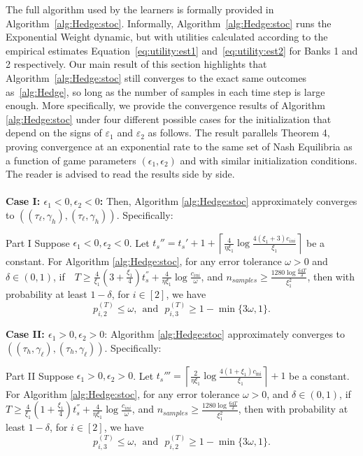 The full algorithm used by the learners is formally provided in Algorithm~\ref{alg:Hedge:stoc}. 
Informally, Algorithm~\ref{alg:Hedge:stoc} runs the Exponential Weight dynamic, but with utilities calculated according to the empirical estimates Equation~\eqref{eq:utility:est1} and~\eqref{eq:utility:est2} for Banks 1 and 2 respectively.
Our main result of this section highlights that Algorithm~\ref{alg:Hedge:stoc} still converges to the exact same outcomes as~\ref{alg:Hedge}, so long as the number of samples in each time step is large enough. More specifically, we provide the convergence results of Algorithm \ref{alg:Hedge:stoc} under four different possible cases for the initialization that depend on the signs of $\varepsilon_1$ and $\varepsilon_2$ as follows.
The result parallels Theorem 4, proving convergence at an exponential rate to the same set of Nash Equilibria as a function of game parameters $(\epsilon_1,\epsilon_2)$ and with similar initialization conditions.
The reader is advised to read the results side by side.
\\
\\\textbf{Case I: $\epsilon_1<0,\epsilon_2<0$:} Then, Algorithm \ref{alg:Hedge:stoc} approximately converges to $((\tau_{\ell},\gamma_{h}),(\tau_{\ell},\gamma_{h}))$. Specifically:

\begin{fixedtheorem}{Part I}\label{thm:stocccc}
Suppose $\epsilon_1<0,\epsilon_2<0$. Let 
$t_s''=t_s'+1+\left\lceil\frac{4}{\eta\xi_1}\log\frac{4(\xi_1+3)c_{ini}}{\xi_1}\right\rceil$ be a constant. For Algorithm \ref{alg:Hedge:stoc}, for any error tolerance $\omega>0$ and $\delta\in(0,1)$, if\ \ $T\geq \frac{4}{\xi_1}\left(3+\frac{\xi_1}{4}\right)t^{''}_s+\frac{4}{\eta\xi_1}\log\frac{c_{ini}}{\omega}$, and $n_{samples}\geq \frac{1280\log\frac{64T}{\delta}}{\xi_1^2}$, then with probability at least $1-\delta$, for $i\in[2]$,  we have 
$$p_{i,2}^{(T)}\leq \omega,\ \  \text{and}\ \ \  p_{i,3}^{(T)}\geq 1-\min\{3\omega,1\}.$$
\end{fixedtheorem}

\noindent \textbf{Case II: $\epsilon_1>0,\epsilon_2>0$}: Algorithm \ref{alg:Hedge:stoc} approximately converges to $((\tau_{h},\gamma_{\ell}),(\tau_{h},\gamma_{\ell}))$. Specifically:

\begin{fixedtheorem}{Part II}
Suppose $\epsilon_1>0,\epsilon_2>0$. Let $t_s'''=\left\lceil\frac{2}{\eta\xi_1}\log\frac{4(1+\xi_1)c_{\text{ini}}}{\xi_1}\right\rceil+1$ be a constant.  For Algorithm \ref{alg:Hedge:stoc}, for any error tolerance $\omega>0$, and $\delta\in(0,1)$, if $T\geq \frac{4}{\xi_1}\left(1+\frac{\xi_1}{4}\right)t^{''}_s+\frac{4}{\eta\xi_1}\log\frac{c_{ini}}{\omega}$, and $n_{samples}\geq \frac{1280\log\frac{64T}{\delta}}{\xi_1^2}$, then with probability at least $1-\delta$, for $i\in[2]$, we have 
$$p_{i,3}^{(T)}\leq \omega,\ \  \text{and}\ \ \  p_{i,2}^{(T)}\geq 1-\min\{3\omega,1\}.$$
\end{fixedtheorem}

